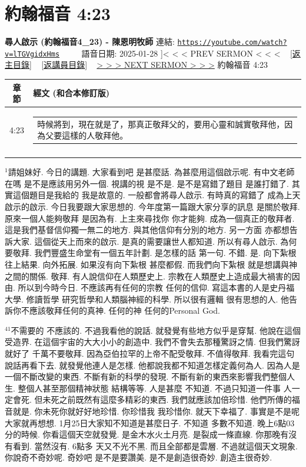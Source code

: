 \documentclass{book}
\begin{document}
\section{約翰福音 4:23}
\label{sec:lTGVgidxHms}
\textbf{尋人啟示 (約翰福音4\_23) - 陳恩明牧師}
\newline
\newline
連結: \href{https://youtube.com/watch?v=lTGVgidxHms}{\texttt{https://youtube.com/watch?v=lTGVgidxHms}} ~~~~ 語音日期: 2025-01-28
\newline
\newline
\hyperref[sec:fRyhfftiI8]]{< < < PREV SERMON < < <}
~
\hyperlink{toc}{[返主目錄]}
~
\hyperref[ch:preacher15]{[返講員目錄]}
~
\hyperref[sec:kQPRWjuPxwQ]{> > > NEXT SERMON > > >}
\newline
\newline
約翰福音 4:23
\newline
\begin{longtable}{cl}
\hline
\hline
章節 & 經文 (和合本修訂版)\\
\hline
4:23 & \begin{tabularx}{0.7\textwidth}{X} 時候將到，現在就是了，那真正敬拜父的，要用心靈和誠實敬拜他，因為父要這樣的人敬拜他。 \end{tabularx} \\ \\
[1ex]
\hline
\hline
\end{longtable}
$^{1}$請姐妹好.
今日的講題.
大家看到吧 是甚麼話.
為甚麼用這個啟示呢.
有中文老師在嗎 是不是應該用另外一個.
視講的視 是不是.
是不是寫錯了題目 是誰打錯了.
其實這個題目是我給的 我是故意的.
一般都會將尋人啟示.
有時真的寫錯了 成為上天啟示的啟示.
今日我要跟大家思想的.
今年度第一篇跟大家分享的訊息 是關於敬拜.
原來一個人能夠敬拜 是因為有.
上主來尋找你 你才能夠.
成為一個真正的敬拜者.
這是我們基督信仰獨一無二的地方.
與其他信仰有分別的地方.
另一方面 亦都想告訴大家.
這個從天上而來的啟示.
是真的需要讓世人都知道.
所以有尋人啟示.
為何要敬拜.
我們豐盛生命堂有一個五年計劃.
是怎樣的話 第一句.
不錯.
是.
向下紮根 往上結果.
向外拓展.
如果沒有向下紮根 甚麼都假.
而我們向下紮根 就是想講與神之間的關係.
敬拜.
有人說信仰在人類歷史上.
宗教在人類歷史上造成最大禍害的因由.
所以到今時今日.
不應該再有任何的宗教 任何的信仰.
寫這本書的人是史丹福大學.
修讀哲學 研究哲學和人類腦神經的科學.
所以很有邏輯 很有思想的人.
他告訴你不應該敬拜任何的真神.
任何的神 任何的Personal God.

$^{41}$不需要的 不應該的.
不過我看他的說話.
就發覺有些地方似乎是穿幫.
他說在這個受造界.
在這個宇宙的大大小小的創造中.
我們不會失去那種驚訝之情.
但我們驚訝就好了 千萬不要敬拜.
因為亞伯拉罕的上帝不配受敬拜.
不值得敬拜.
我看完這句說話再看下去.
就發覺他連人是怎樣.
他都說我都不知道怎樣定義何為人.
因為人是一個不斷改變的東西.
不斷有新的科學的發現.
不斷有新的東西來影響我們整個人生.
整個人甚至那個精神狀態 結構等等.
人是甚麼 不知道.
不過只知道一件事 人一定會死.
但未死之前既然有這麼多精彩的東西.
我們就應該加倍珍惜.
他們所傳的福音就是.
你未死你就好好地珍惜.
你珍惜我 我珍惜你.
就天下幸福了.
事實是不是呢 大家就再想想.
1月25日大家知不知道是甚麼日子.
不知道 多數不知道.
晚上6點03分的時候.
你看這個天空就發覺.
是金木水火土月亮.
是裂成一條直線.
你那晚有沒有看到.
當然沒有.
6點多 天又不光不黑.
而且全部都是雲層.
不過就這個天文現象.
你說奇不奇妙呢.
奇妙吧 是不是要讚美.
是不是創造很奇妙.
創造主很奇妙.
\end{document}
